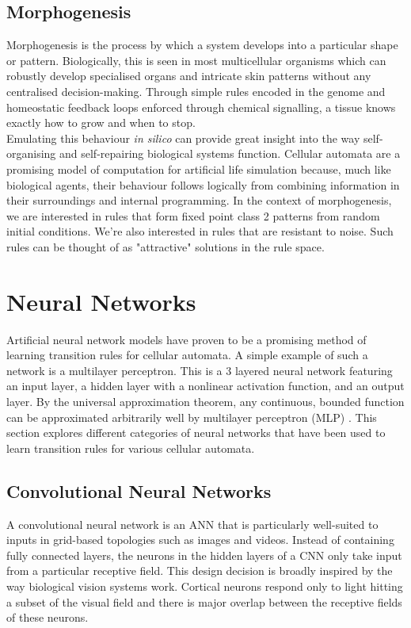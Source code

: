 \subsection{Morphogenesis}
Morphogenesis is the process by which a system develops into a particular shape or pattern. 
Biologically, this is seen in most multicellular organisms which can robustly develop specialised organs and intricate skin patterns without any centralised decision-making.
Through simple rules encoded in the genome and homeostatic feedback loops enforced through chemical signalling, a tissue knows exactly how to grow and when to stop.\\

Emulating this behaviour \textit{in silico} can provide great insight into the way self-organising and self-repairing biological systems function.
Cellular automata are a promising model of computation for artificial life simulation because, much like biological agents, their behaviour follows logically from combining information in their surroundings and internal programming.
In the context of morphogenesis, we are interested in rules that form fixed point class 2 patterns from random initial conditions. 
We're also interested in rules that are resistant to noise.
Such rules can be thought of as "attractive" solutions in the rule space.

\section{Neural Networks}
Artificial neural network models have proven to be a promising method of learning transition rules for cellular automata. A simple example of such a network is a multilayer perceptron. This is a 3 layered neural network featuring an input layer, a hidden layer with a nonlinear activation function, and an output layer. By the universal approximation theorem, any continuous, bounded function can be approximated arbitrarily well by multilayer perceptron (MLP) . This section explores different categories of neural networks that have been used to learn transition rules for various cellular automata.

\subsection{Convolutional Neural Networks}
A convolutional neural network is an ANN that is particularly well-suited to inputs in grid-based topologies such as images and videos.
Instead of containing fully connected layers, the neurons in the hidden layers of a CNN only take input from a particular receptive field.
This design decision is broadly inspired by the way biological vision systems work.
Cortical neurons respond only to light hitting a subset of the visual field and there is major overlap between the receptive fields of these neurons.\\

